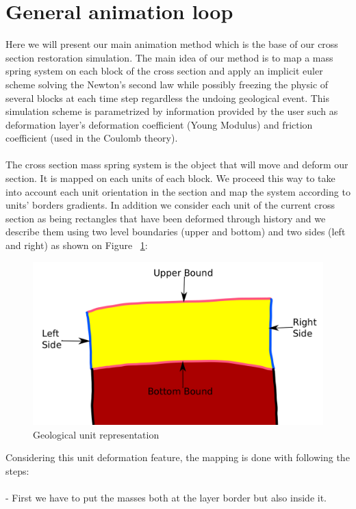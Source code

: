 \documentclass[12pt, a4paper]{report} %
\begin{document}
\section{General animation loop}
\label{sec:generalanimation}
Here we will present our main animation method which is the base of our cross section restoration simulation. 
The main idea of our method is to map a mass spring system on each block of the cross section and apply an implicit euler scheme solving the Newton's second law while possibly freezing the physic of several blocks at each time step regardless the undoing geological event. 
This simulation scheme is parametrized by information provided by the user such as deformation layer's deformation coefficient (Young Modulus) and friction coefficient (used in the Coulomb theory).\\\\
The cross section mass spring system is the object that will move and deform our section. It is mapped on each units of each block. We proceed this way to take into account each unit orientation in the section and map the system according to units' borders gradients. In addition we consider each unit of the current cross section as being rectangles that have been deformed through history and we describe them using two level boundaries (upper and bottom) and two sides (left and right) as shown on Figure ~\ref{unitdecr}:
 \begin{figure}[H]
	\centering
	\includegraphics[scale=0.3]{unitDescriptionEdit.png}
	\caption{Geological unit representation}
	\label{unitdecr}
\end{figure}
Considering this unit deformation feature, the mapping is done with following the steps:	\\\\		
\indent	- First we have to put the masses both at the layer border but also inside it.\\\\
\end{document}
